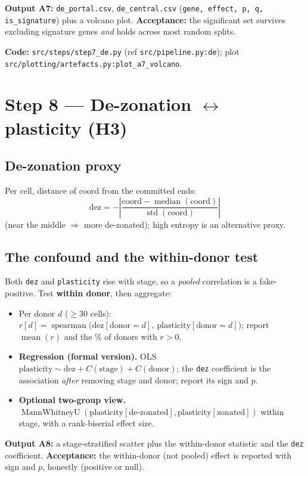 \documentclass[11pt]{article}
\newcommand{\code}[1]{\texttt{\small #1}}
\newcommand{\coordc}{\mathrm{coord}}
\begin{document}
\textbf{Output A7:} \code{de\_portal.csv}, \code{de\_central.csv}
(\code{gene, effect, p, q, is\_signature}) plus a volcano plot.
\textbf{Acceptance:} the significant set survives excluding signature genes \emph{and} holds across
most random splits.

\medskip
\noindent\textbf{Code:} \code{src/steps/step7\_de.py} (ref \code{src/pipeline.py:de});
plot \code{src/plotting/artefacts.py:plot\_a7\_volcano}.

\section{Step 8 --- De-zonation $\leftrightarrow$ plasticity (H3)}

\subsection{De-zonation proxy}
Per cell, distance of $\coordc$ from the committed ends:
\[
  \text{dez} = -\left|\frac{\coordc - \operatorname{median}(\coordc)}{\operatorname{std}(\coordc)}\right|
\]
(near the middle $\Rightarrow$ more de-zonated); high entropy is an alternative proxy.

\subsection{The confound and the within-donor test}
Both \code{dez} and \code{plasticity} rise with stage, so a \emph{pooled} correlation is a
fake-positive. Test \textbf{within donor}, then aggregate:
\begin{itemize}[leftmargin=1.4em]
  \item Per donor $d$ ($\ge 30$ cells):
        $r[d] = \operatorname{spearman}\big(\text{dez}[\text{donor}=d],\ \text{plasticity}[\text{donor}=d]\big)$;
        report $\operatorname{mean}(r)$ and the $\%$ of donors with $r > 0$.
  \item \textbf{Regression (formal version).} OLS
        $\text{plasticity} \sim \text{dez} + C(\text{stage}) + C(\text{donor})$; the \code{dez}
        coefficient is the association \emph{after} removing stage and donor; report its sign and
        $p$.
  \item \textbf{Optional two-group view.}
        $\operatorname{MannWhitneyU}(\text{plasticity}[\text{de-zonated}], \text{plasticity}[\text{zonated}])$
        within stage, with a rank-biserial effect size.
\end{itemize}

\textbf{Output A8:} a stage-stratified scatter plus the within-donor statistic and the \code{dez}
coefficient. \textbf{Acceptance:} the within-donor (not pooled) effect is reported with sign and
$p$, honestly (positive or null).
\end{document}
